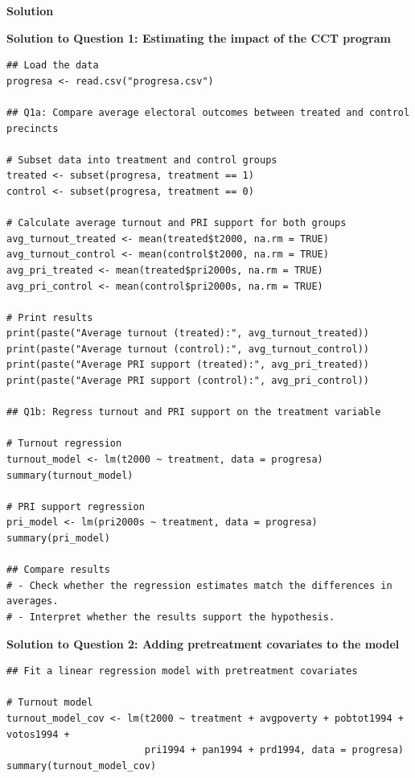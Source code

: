 \documentclass[12pt]{article}
\newif\ifsolutions
\begin{document}
\ifsolutions
{\color{blue}

\begin{center}
    \textbf{\large Solution}    
\end{center}

\textbf{Solution to Question 1: Estimating the impact of the CCT program}

\begin{verbatim}
## Load the data
progresa <- read.csv("progresa.csv")

## Q1a: Compare average electoral outcomes between treated and control precincts

# Subset data into treatment and control groups
treated <- subset(progresa, treatment == 1)
control <- subset(progresa, treatment == 0)

# Calculate average turnout and PRI support for both groups
avg_turnout_treated <- mean(treated$t2000, na.rm = TRUE)
avg_turnout_control <- mean(control$t2000, na.rm = TRUE)
avg_pri_treated <- mean(treated$pri2000s, na.rm = TRUE)
avg_pri_control <- mean(control$pri2000s, na.rm = TRUE)

# Print results
print(paste("Average turnout (treated):", avg_turnout_treated))
print(paste("Average turnout (control):", avg_turnout_control))
print(paste("Average PRI support (treated):", avg_pri_treated))
print(paste("Average PRI support (control):", avg_pri_control))

## Q1b: Regress turnout and PRI support on the treatment variable

# Turnout regression
turnout_model <- lm(t2000 ~ treatment, data = progresa)
summary(turnout_model)

# PRI support regression
pri_model <- lm(pri2000s ~ treatment, data = progresa)
summary(pri_model)

## Compare results
# - Check whether the regression estimates match the differences in averages.
# - Interpret whether the results support the hypothesis.
\end{verbatim}

\textbf{Solution to Question 2: Adding pretreatment covariates to the model}

\begin{verbatim}
## Fit a linear regression model with pretreatment covariates

# Turnout model
turnout_model_cov <- lm(t2000 ~ treatment + avgpoverty + pobtot1994 + votos1994 + 
                        pri1994 + pan1994 + prd1994, data = progresa)
summary(turnout_model_cov)


\end{verbatim}}
\end{document}
